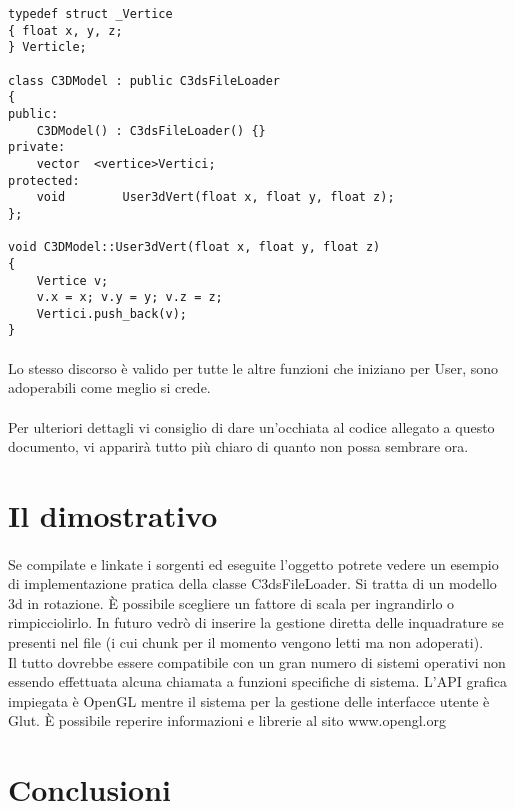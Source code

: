 \documentclass[11pt,a4paper]{article}
\begin{document}
\begin{verbatim}
typedef struct _Vertice
{ float	x, y, z;
} Verticle;

class C3DModel : public C3dsFileLoader
{
public:
	C3DModel() : C3dsFileLoader() {}
private:
	vector	<vertice>Vertici;
protected:
	void		User3dVert(float x, float y, float z);
};

void C3DModel::User3dVert(float x, float y, float z)
{
	Vertice v;
	v.x = x; v.y = y; v.z = z;
	Vertici.push_back(v);
}
\end{verbatim}

\paragraph*{}
Lo stesso discorso \`e valido per tutte le altre funzioni che iniziano per User, sono adoperabili come meglio si crede.

\paragraph*{}
Per ulteriori dettagli vi consiglio di dare un'occhiata al codice allegato a questo documento, vi apparir\`a tutto pi\`u chiaro di quanto non possa sembrare ora.

\section*{Il dimostrativo}

\paragraph*{}
Se compilate e linkate i sorgenti ed eseguite l'oggetto potrete vedere un esempio di implementazione pratica della classe C3dsFileLoader. Si tratta di un modello 3d in rotazione. \`E possibile scegliere un fattore di scala per ingrandirlo o rimpicciolirlo. In futuro vedr\`o di inserire la gestione diretta delle inquadrature se presenti nel file (i cui chunk per il momento vengono letti ma non adoperati).\\
Il tutto dovrebbe essere compatibile con un gran numero di sistemi operativi non essendo effettuata alcuna chiamata a funzioni specifiche di sistema. L'API grafica impiegata \`e OpenGL mentre il sistema per la gestione delle interfacce utente \`e Glut. \`E possibile reperire informazioni e librerie al sito www.opengl.org

\section*{Conclusioni}
\end{document}
